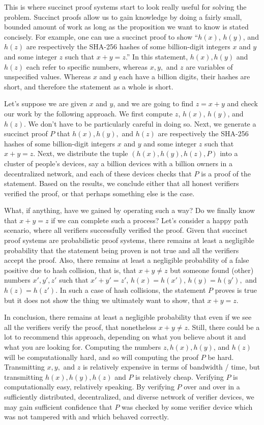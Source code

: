 \documentclass[11pt]{article}
\begin{document}
This is where succinct proof systems start to look really useful for solving the problem.
Succinct proofs allow us to gain knowledge by doing a fairly small, bounded amount of work
as long as the proposition we want to know is stated concisely.
For example, one can use a succinct proof to show ``$h(x)$, $h(y)$, and $h(z)$ are
respectively the SHA-256 hashes of some billion-digit integers $x$ and $y$ and some
integer $z$ such that $x + y = z$.'' In this statement, $h(x), h(y)$ and $h(z)$ each
refer to specific numbers, whereas $x, y,$ and $z$ are variables of unspecified values.
Whereas $x$ and $y$ each have a billion digits, their hashes are short, and therefore
the statement as a whole is short.

Let's suppose we are given $x$ and $y$, and we are going to find $z = x + y$ and check
our work by the following approach. We first compute $z$, $h(x)$, $h(y)$, and $h(z)$.
We don't have to be particularly careful in doing so. Next, we generate
a succinct proof $P$ that $h(x), h(y),$ and $h(z)$ are respectively the SHA-256
hashes of some billion-digit integers $x$ and $y$ and some integer $z$ such that
$x + y = z$. Next, we distribute the tuple $(h(x), h(y), h(z), P)$ into a cluster of
people's devices, say a billion devices with a billion owners in a decentralized
network, and each of these devices checks that $P$ is a proof of the statement.
Based on the results, we conclude either that all honest verifiers verified the proof,
or that perhaps something else is the case.

What, if anything, have we gained by operating such a way? Do we finally know that
$x + y = z$ if we can complete such a process? Let's consider a happy path scenario,
where all verifiers successfully verified the proof. Given that succinct proof systems
are probabilistic proof systems, there remains at least a negligible probability that
the statement being proven is not true and all the verifiers accept the proof. Also,
there remains at least a negligible probability of a false positive due to hash collision,
that is, that $x + y \neq z$ but someone found (other) numbers $x', y', z'$ such
that $x' + y' = z'$, $h(x) = h(x')$, $h(y) = h(y'),$ and $h(z) = h(z')$. In such a
case of hash collisions, the statement $P$ proves is true but it does not show the
thing we ultimately want to show, that $x + y = z$.

In conclusion, there remains at least a negligible
probability that even if we see all the verifiers verify the proof, that nonetheless
$x + y \neq z$. Still, there could be a lot to recommend this approach, depending on
what you believe about it and what you are looking for. Computing the numbers $z, h(x), h(y)$,
and $h(z)$ will be computationally hard, and so will computing the proof $P$ be hard.
Transmitting $x, y,$ and $z$ is relatively expensive in terms of bandwidth / time,
but transmitting $h(x), h(y), h(z)$ and $P$ is relatively cheap. Verifying $P$ is
computationally easy, relatively speaking. By verifying $P$ over and over in a sufficiently
distributed, decentralized, and diverse network of verifier devices, we may gain
sufficient confidence that $P$ was checked by some verifier device which was not tampered
with and which behaved correctly. 
\end{document}

